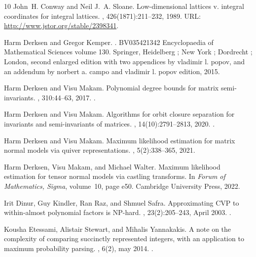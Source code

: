 \documentclass[10pt,a4paper]{article}
\theoremstyle{definition}
\numberwithin{equation}{section}
\begin{document}
\begin{thebibliography}{10}
John~H. Conway and Neil J.~A. Sloane.
\newblock Low-dimensional lattices v. integral coordinates for integral
  lattices.
, 426(1871):211--232, 1989.
\newblock URL: \url{http://www.jstor.org/stable/2398341}.

Harm Derksen and Gregor Kemper.
.
\newblock BV035421342 Encyclopaedia of Mathematical Sciences volume 130.
  Springer, Heidelberg ; New York ; Dordrecht ; London, second enlarged edition
  with two appendices by vladimir l. popov, and an addendum by norbert a. campo
  and vladimir l. popov edition, 2015.

Harm Derksen and Visu Makam.
\newblock Polynomial degree bounds for matrix semi-invariants.
, 310:44--63, 2017.
\newblock \href {https://doi.org/10.1016/j.aim.2017.01.018}
  {}.

Harm Derksen and Visu Makam.
\newblock Algorithms for orbit closure separation for invariants and
  semi-invariants of matrices.
, 14(10):2791--2813, 2020.
\newblock \href {https://doi.org/10.2140/ant.2020.14.2791}
  {}.

Harm Derksen and Visu Makam.
\newblock Maximum likelihood estimation for matrix normal models via quiver
  representations.
, 5(2):338--365,
  2021.

Harm Derksen, Visu Makam, and Michael Walter.
\newblock Maximum likelihood estimation for tensor normal models via castling
  transforms.
\newblock In {\em Forum of Mathematics, Sigma}, volume~10, page e50. Cambridge
  University Press, 2022.

Irit Dinur, Guy Kindler, Ran Raz, and Shmuel Safra.
\newblock Approximating {CVP} to within-almost polynomial factors is {NP}-hard.
, 23(2):205--243, April 2003.
\newblock \href {https://doi.org/10.1007/s00493-003-0019-y}
  {}.

Kousha Etessami, Alistair Stewart, and Mihalis Yannakakis.
\newblock A note on the complexity of comparing succinctly represented
  integers, with an application to maximum probability parsing.
, 6(2), may 2014.
\newblock \href {https://doi.org/10.1145/2601327} {}.


\end{thebibliography}
\end{document}
